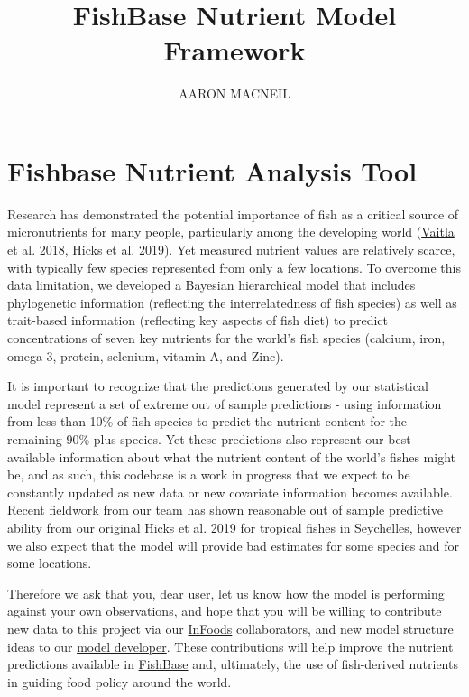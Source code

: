 \documentclass{article}
\title{FishBase Nutrient Model Framework}
\author{AARON MACNEIL}
\begin{document}
\maketitle


\section{Fishbase Nutrient Analysis Tool}

Research has demonstrated the potential importance of fish as a critical source of micronutrients for many people, particularly among the developing world (\href{https://www.nature.com/articles/s41467-018-06199-w}{Vaitla et al. 2018}, \href{https://www.nature.com/articles/s41586-019-1592-6}{Hicks et al. 2019}).  Yet measured nutrient values are relatively scarce, with typically few species represented from only a few locations. To overcome this data limitation, we developed a Bayesian hierarchical model that includes phylogenetic information (reflecting the interrelatedness of fish species) as well as trait-based information (reflecting key aspects of fish diet) to predict concentrations of seven key nutrients for the world's fish species (calcium, iron, omega-3, protein, selenium, vitamin A, and Zinc).

It is important to recognize that the predictions generated by our statistical model represent a set of extreme out of sample predictions - using information from less than 10\% of fish species to predict the nutrient content for the remaining 90\% plus species. Yet these predictions also represent our best available information about what the nutrient content of the world's fishes might be, and as such, this codebase is a work in progress that we expect to be constantly updated as new data or new covariate information becomes available. Recent fieldwork from our team has shown reasonable out of sample predictive ability from our original \href{https://www.nature.com/articles/s41586-019-1592-6}{Hicks et al. 2019} for tropical fishes in Seychelles, however we also expect that the model will provide bad estimates for some species and for some locations. 

Therefore we ask that you, dear user, let us know how the model is performing against your own observations, and hope that you will be willing to contribute new data to this project via our \href{http://www.fao.org/infoods/infoods/en/}{InFoods} collaborators, and new model structure ideas to our \href{mailto:a.macneil@dal.ca}{model developer}. These contributions will help improve the nutrient predictions available in \href{https://fishbase.ca/Nutrients/NutrientSearch.php}{FishBase} and, ultimately, the use of fish-derived nutrients in guiding food policy around the world.
\end{document}
